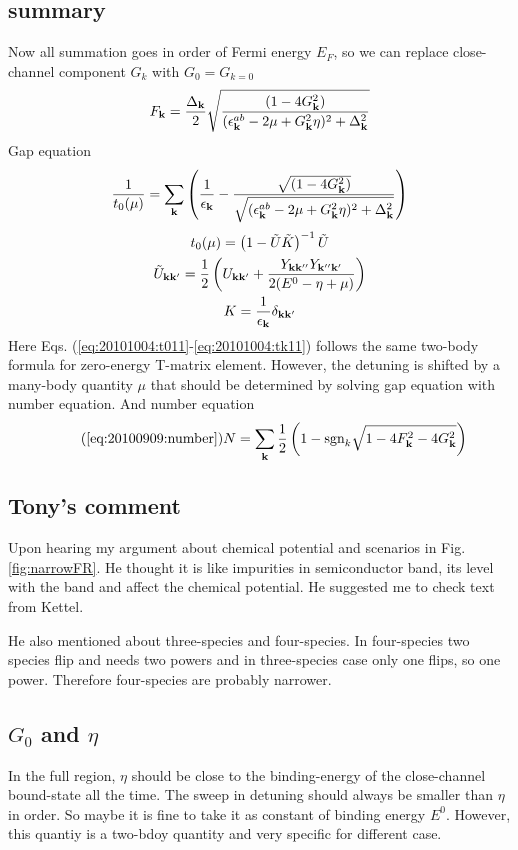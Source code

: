 \subsection{summary}
Now all summation goes in order of Fermi energy $E_F$, so we can replace close-channel component $G_k$ with $G_0=G_{k=0}$
\begin{equation}
F_{\mathbf{k}}=\frac{\Delta_{\mathbf{k}}}2\sqrt{\frac{(1-4G_{\mathbf{k}}^{2})}{(\epsilon^{ab}_{\mathbf{k}}-2\mu+  G_{\mathbf{k}}^2\eta)^{2}+\Delta_{\mathbf{k}}^{2}}}
\end{equation}
Gap equation 
\begin{equation}\label{eq:20101004:gapS}
\frac{1}{{t_{0}}(\mu)}=\sum_{\mathbf{k}}
\left(\frac{1}{\epsilon_{\mathbf{k}}}-\frac{\sqrt{(1-4G_{\mathbf{k}}^{2})}}{\sqrt{{(\epsilon^{ab}_{\mathbf{k}}-2\mu+  G_{\mathbf{k}}^2\eta)^{2}+\Delta_{\mathbf{k}}^{2}}}}\right)
\end{equation} 
\begin{gather}
{t_{0}}(\mu)=\left(1-\tilde{U}\tilde{ K}\right)^{-1}\tilde{U}\label{eq:20101004:t011}\\
\tilde{U}_{\mathbf{k}\mathbf{k}'}=\frac{1}{2} \left(U_{\mathbf{k}\mathbf{k}'}+\frac{Y_{\mathbf{k}\mathbf{k}''}Y_{\mathbf{k}''\mathbf{k}'}}{2(E^{0}-\eta+\mu)}\right)\label{eq:20101004:tu11}\\
{K}=\frac{1}{\epsilon_{\mathbf{k}}}\delta_{\mathbf{k}\mathbf{k}'}\label{eq:20101004:tk11}
\end{gather}
Here Eqs. (\ref{eq:20101004:t011}-\ref{eq:20101004:tk11}) follows the same two-body formula for zero-energy T-matrix element.  However, the detuning is shifted by a many-body quantity $\mu$ that should be determined by solving gap equation with number equation.  
And number equation
\begin{equation}\tag{\ref{eq:20100909:number}}
N=\sum_{\vk}\frac{1}{2} \left(1-\sgn_{k}\sqrt{1-4 F_{\vk}^2-4 G_{\vk}^2}\right)
\end{equation} 

\subsection{Tony's comment}
Upon hearing my argument about chemical potential and scenarios in Fig. \ref{fig:narrowFR}. He thought it is like impurities in semiconductor band, its level with the band and affect the chemical potential. He suggested me to check text from Kettel.  

He also mentioned about three-species and four-species.  In four-species two species flip and needs two powers and in three-species case only one flips, so one power.  Therefore four-species are probably narrower.  

\subsection{$G_0$ and $\eta$}
In the full region, $\eta$ should be close to the binding-energy of the close-channel bound-state all the time.  The sweep in detuning should always be smaller than $\eta$ in order.  So maybe it is fine to take it as constant of binding energy $E^0$.  However, this quantiy is a two-bdoy quantity and very specific for different case. 

